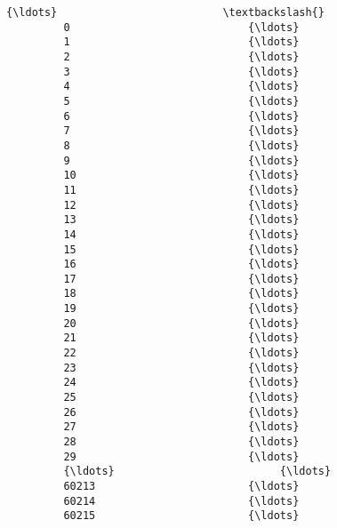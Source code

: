 \documentclass[11pt]{article}
\begin{document}
\begin{Verbatim}[commandchars=\\\{\}]
                                      {\ldots}                          \textbackslash{}
         0                            {\ldots}                           
         1                            {\ldots}                           
         2                            {\ldots}                           
         3                            {\ldots}                           
         4                            {\ldots}                           
         5                            {\ldots}                           
         6                            {\ldots}                           
         7                            {\ldots}                           
         8                            {\ldots}                           
         9                            {\ldots}                           
         10                           {\ldots}                           
         11                           {\ldots}                           
         12                           {\ldots}                           
         13                           {\ldots}                           
         14                           {\ldots}                           
         15                           {\ldots}                           
         16                           {\ldots}                           
         17                           {\ldots}                           
         18                           {\ldots}                           
         19                           {\ldots}                           
         20                           {\ldots}                           
         21                           {\ldots}                           
         22                           {\ldots}                           
         23                           {\ldots}                           
         24                           {\ldots}                           
         25                           {\ldots}                           
         26                           {\ldots}                           
         27                           {\ldots}                           
         28                           {\ldots}                           
         29                           {\ldots}                           
         {\ldots}                          {\ldots}                           
         60213                        {\ldots}                           
         60214                        {\ldots}                           
         60215                        {\ldots}                           

\end{Verbatim}
\end{document}

